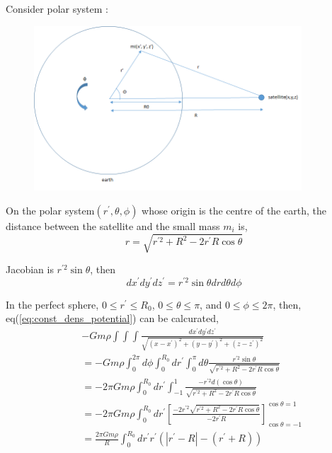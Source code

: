 \documentclass{jarticle}
\newcommand*{\trippleint}{\int\!\!\!\int\!\!\!\int}
\begin{document}
Consider polar system : 
\begin{figure}[htbp]
	\includegraphics[width=10cm]{earth_satellite.png}
\end{figure}

On the polar system$(r^\prime, \theta, \phi)$ whose origin is the centre of the earth, the distance between the satellite and the small mass $m_i$ is, 
\begin{equation}
	r = \sqrt{r^{\prime 2} + R^2 - 2 r^\prime R \cos\theta}
\end{equation}

Jacobian is $r^{\prime 2}\sin\theta$, then
\begin{equation}
	dx^\prime dy^\prime dz^\prime = r^{\prime 2}\sin\theta drd\theta d\phi
\end{equation}

In the perfect sphere, $0 \leq r^\prime \leq R_0$, $0 \leq \theta \leq \pi$, and $0 \leq \phi \leq 2\pi$, then,  eq(\ref{eq:const_dens_potential}) can be calcurated, 
\begin{eqnarray}\label{eq:calcurated_potential}
	&&-Gm\rho \trippleint \frac{dx^\prime dy^\prime dz^\prime}{\sqrt{(x - x^\prime)^2 + (y - y^\prime)^2 + (z - z^\prime)^2}} \nonumber \\	 
	&&= -Gm\rho \int_0^{2\pi} d\phi \int_0^{R_0} dr^\prime \int_0^\pi d\theta \frac{r^{\prime 2}\sin\theta}{\sqrt{r^{\prime 2} + R^2 - 2 r^\prime R \cos\theta}} \nonumber \\	
	&&= -2\pi Gm\rho \int_0^{R_0} dr^\prime \int_{-1}^{1} \frac{-r^{\prime 2} d(\cos\theta)}{\sqrt{r^{\prime 2} + R^2 - 2 r^\prime R \cos\theta}} \nonumber\\
	&&= -2\pi Gm\rho \int_0^{R_0} dr^\prime \left[ \frac{-2r^{\prime 2} \sqrt{r^{\prime 2} + R^2 - 2 r^\prime R \cos\theta}}{-2r^\prime R} \right]_{\cos\theta = -1}^{\cos\theta = 1} \nonumber \\
	&&= \frac{2\pi Gm\rho}{R} \int_0^{R_0} dr^\prime r^\prime (|r^\prime - R| - (r^\prime + R)) 
\end{eqnarray}
\end{document}
